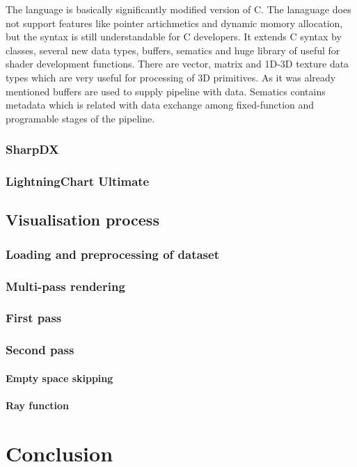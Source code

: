 \documentclass[twoside, english, 11pt]{report}
\begin{document}
The language is basically significantly modified version of C. The lanaguage does not support features like pointer artichmetics and dynamic momory allocation, but the syntax is still understandable for C developers. It extends C syntax by classes, several new data types, buffers, sematics and huge library of useful for shader development functions. There are vector, matrix and 1D-3D texture data types which are very useful for processing of 3D primitives. As it was already mentioned buffers are used to supply pipeline with data. Sematics contains metadata which is related with data exchange among fixed-function and programable stages of the pipeline.
\subsection{SharpDX}
\subsection{LightningChart Ultimate}
\section{Visualisation process}
\subsection{Loading and preprocessing of dataset}
\subsection{Multi-pass rendering}
\subsection{First pass}
\subsection{Second pass}
\subsubsection{Empty space skipping}
\subsubsection{Ray function}

\chapter{Conclusion}
\end{document}
